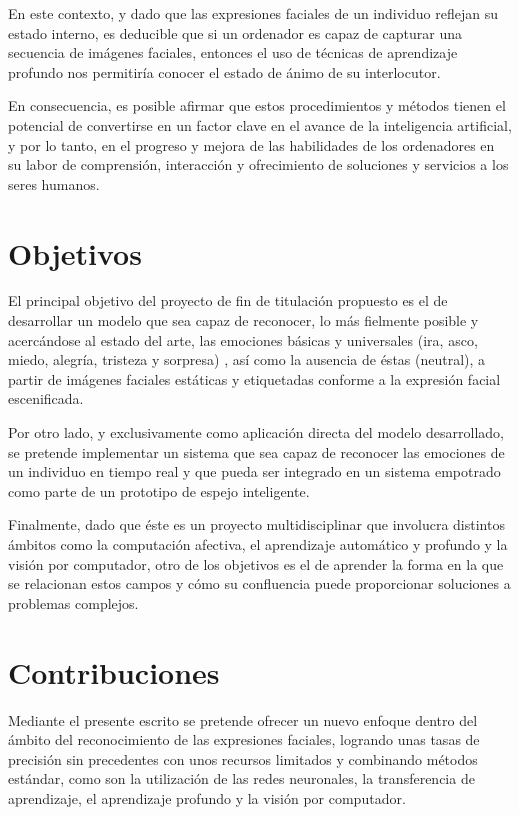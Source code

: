 En este contexto, y dado que las expresiones faciales de un individuo reflejan su estado interno, es deducible que si un ordenador es capaz de capturar una secuencia de imágenes faciales, entonces el uso de técnicas de aprendizaje profundo nos permitiría conocer el estado de ánimo de su interlocutor. 

En consecuencia, es posible afirmar que estos procedimientos y métodos tienen el potencial de convertirse en un factor clave en el avance de la inteligencia artificial, y por lo tanto, en el progreso y mejora de las habilidades de los ordenadores en su labor de comprensión, interacción y ofrecimiento de soluciones y servicios a los seres humanos.

\section{Objetivos}

El principal objetivo del proyecto de fin de titulación propuesto es el de desarrollar un modelo que sea capaz de reconocer, lo más fielmente posible y acercándose al estado del arte, las emociones básicas y universales (ira, asco, miedo, alegría, tristeza y sorpresa)  \cite{Ekman}, así como la ausencia de éstas (neutral), a partir de imágenes faciales estáticas y etiquetadas conforme a la expresión facial escenificada.

Por otro lado, y exclusivamente como aplicación directa del modelo desarrollado, se pretende implementar un sistema que sea capaz de reconocer las emociones de un individuo en tiempo real y que pueda ser integrado en un sistema empotrado como parte de un prototipo de espejo inteligente.

Finalmente, dado que éste es un proyecto multidisciplinar que involucra distintos ámbitos como la computación afectiva, el aprendizaje automático y profundo y la visión por computador, otro de los objetivos es el de aprender la forma en la que se relacionan estos campos y cómo su confluencia puede proporcionar soluciones a problemas complejos.

\section{Contribuciones}

Mediante el presente escrito se pretende ofrecer un nuevo enfoque dentro del ámbito del reconocimiento de las expresiones faciales, logrando unas tasas de precisión sin precedentes con unos recursos limitados y combinando métodos estándar, como son la utilización de las redes neuronales, la transferencia de aprendizaje, el aprendizaje profundo y la visión por computador.
 
